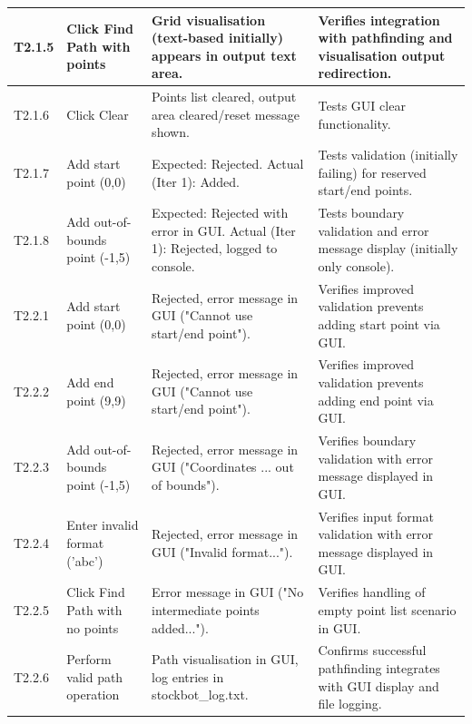 \begin{longtable}{|p{}|p{}|p{}|p{}|}
	\hline
	T2.1.5 & Click Find Path with points & Grid visualisation (text-based initially) appears in output text area. & Verifies integration with pathfinding and visualisation output redirection. \\
	\hline
	T2.1.6 & Click Clear & Points list cleared, output area cleared/reset message shown. & Tests GUI clear functionality. \\
	\hline
	T2.1.7 & Add start point (0,0) & Expected: Rejected. Actual (Iter 1): Added. & Tests validation (initially failing) for reserved start/end points. \\
	\hline
	T2.1.8 & Add out-of-bounds point (-1,5) & Expected: Rejected with error in GUI. Actual (Iter 1): Rejected, logged to console. & Tests boundary validation and error message display (initially only console). \\
	\hline
	T2.2.1 & Add start point (0,0) & Rejected, error message in GUI ("Cannot use start/end point"). & Verifies improved validation prevents adding start point via GUI. \\
	\hline
	T2.2.2 & Add end point (9,9) & Rejected, error message in GUI ("Cannot use start/end point"). & Verifies improved validation prevents adding end point via GUI. \\
	\hline
	T2.2.3 & Add out-of-bounds point (-1,5) & Rejected, error message in GUI ("Coordinates ... out of bounds"). & Verifies boundary validation with error message displayed in GUI. \\
	\hline
	T2.2.4 & Enter invalid format (’abc’) & Rejected, error message in GUI ("Invalid format..."). & Verifies input format validation with error message displayed in GUI. \\
	\hline
	T2.2.5 & Click Find Path with no points & Error message in GUI ("No intermediate points added..."). & Verifies handling of empty point list scenario in GUI. \\
	\hline
	T2.2.6 & Perform valid path operation & Path visualisation in GUI, log entries in stockbot\_log.txt. & Confirms successful pathfinding integrates with GUI display and file logging. \\
	\hline
\end{longtable}


